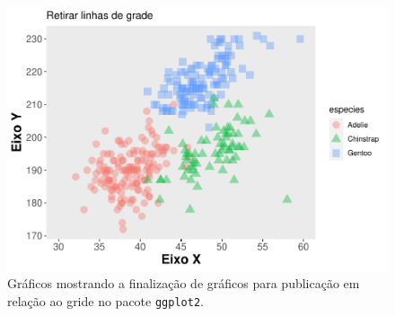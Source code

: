 \documentclass[
]{article}
\begin{document}
\begin{figure}
\centering
\includegraphics{epr_files/figure-latex/fig-plot-final-gride-2.pdf}
\caption{\label{fig:fig-plot-final-gride-2}Gráficos mostrando a finalização de gráficos para publicação em relação ao gride no pacote \texttt{ggplot2}.}
\end{figure}
\end{document}
